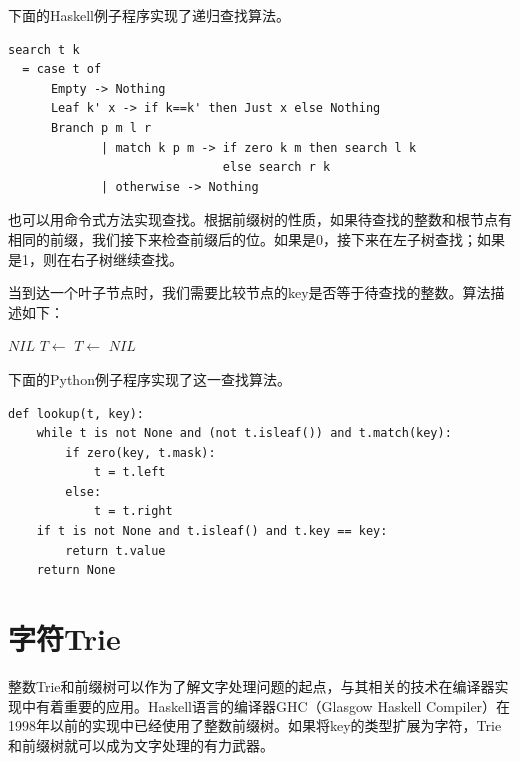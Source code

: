 \documentclass[b5paper]{ctexart}
\begin{document}
下面的Haskell例子程序实现了递归查找算法。

\lstset{language=Haskell}
\begin{lstlisting}[style=Haskell]
search t k
  = case t of
      Empty -> Nothing
      Leaf k' x -> if k==k' then Just x else Nothing
      Branch p m l r
             | match k p m -> if zero k m then search l k
                              else search r k
             | otherwise -> Nothing
\end{lstlisting}

也可以用命令式方法实现查找。根据前缀树的性质，如果待查找的整数和根节点有相同的前缀，我们接下来检查前缀后的位。如果是0，接下来在左子树查找；如果是1，则在右子树继续查找。

当到达一个叶子节点时，我们需要比较节点的key是否等于待查找的整数。算法描述如下：

\begin{algorithmic}[1]
    \State \Return $NIL$ 
  \EndIf
      \State $T \gets$ 
    \Else
      \State $T \gets$ 
    \EndIf
  \EndWhile
    \State \Return {}
  \Else
    \State \Return $NIL$ 
  \EndIf
\EndFunction
\end{algorithmic}

下面的Python例子程序实现了这一查找算法。

\lstset{language=Python}
\begin{lstlisting}
def lookup(t, key):
    while t is not None and (not t.isleaf()) and t.match(key):
        if zero(key, t.mask):
            t = t.left
        else:
            t = t.right
    if t is not None and t.isleaf() and t.key == key:
        return t.value
    return None
\end{lstlisting}


\section{字符Trie}

整数Trie和前缀树可以作为了解文字处理问题的起点，与其相关的技术在编译器实现中有着重要的应用。Haskell语言的编译器GHC（Glasgow Haskell Compiler）在1998年以前的实现中已经使用了整数前缀树\cite{okasaki-int-map}。如果将key的类型扩展为字符，Trie和前缀树就可以成为文字处理的有力武器。
\end{document}
